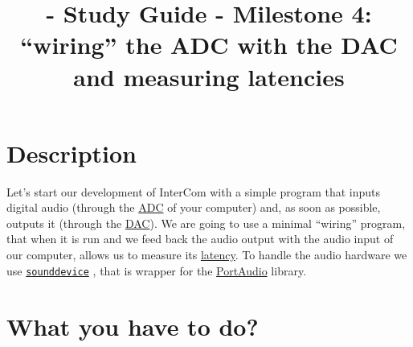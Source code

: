 
\title{\TM{} - Study Guide - Milestone 4: ``wiring'' the ADC with the DAC and measuring latencies}

\maketitle

\section{Description}

Let's start our development of InterCom with a simple program that
inputs digital audio (through the
\href{https://en.wikipedia.org/wiki/Analog-to-digital_converter}{ADC}
of your computer) and, as soon as possible, outputs it (through the
\href{https://en.wikipedia.org/wiki/Digital-to-analog_converter}{DAC}). We
are going to use a minimal ``wiring'' program, that when it is run and
we feed back the audio output with the audio input of our computer,
allows us to measure
its \href{https://en.wikipedia.org/wiki/Latency_(engineering)}{latency}. To
handle the audio hardware we use
\href{https://python-sounddevice.readthedocs.io}{\texttt{sounddevice}}
\cite{sounddevice}, that is wrapper for the
\href{http://www.portaudio.com/}{PortAudio} library.

\section{What you have to do?}


